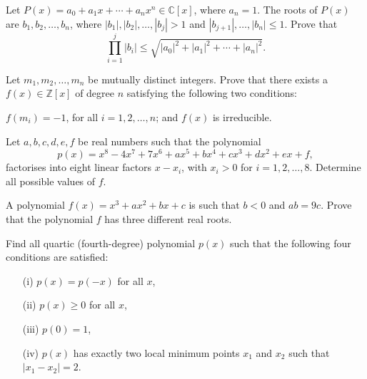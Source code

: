 \documentclass[12pt,a4paper]{memoir}
\theoremstyle{definition}
\begin{document}
\begin{question}[name={1995 Taiwan}]
	Let $P(x)=a_{0}+a_{1}x+\cdots+a_{n}x^{n}\in\mathbb{C}[x]$, where $a_{n}=1$. The roots of $P(x)$ are $b_{1},b_{2},\dots,b_{n}$, where $|b_{1}|,|b_{2}|,\dots,|b_{j}|>1$ and $|b_{j+1}|,\dots,|b_{n}|\leq 1$. Prove that \[\prod_{i=1}^{j} |b_{i}| \leq \sqrt{|a_{0}|^{2}+|a_{1}|^{2}+\cdots+|a_{n}|^{2}}.\]
\end{question}



\begin{question}[name={1995 Taiwan}]
	Let $m_{1},m_{2},\dots,m_{n}$ be mutually distinct integers. Prove that there exists a $f(x)\in\mathbb{Z}[x]$ of degree $n$ satisfying the following two conditions:
	\begin{tasks}
		\task $f(m_{i})=-1$, for all $i=1,2,\dots,n$; and
		\task $f(x)$ is irreducible.
	\end{tasks}
\end{question}



\begin{question}[name={2003 APMO}]
	Let $a,b,c,d,e,f$ be real numbers such that the polynomial
	\[ p(x)=x^8-4x^7+7x^6+ax^5+bx^4+cx^3+dx^2+ex+f, \]
	factorises into eight linear factors $x-x_i$, with $x_i>0$ for $i=1,2,\dots,8$. Determine all possible values of $f$.
\end{question}



\begin{question}[name={1992 Baltic Way}]
	A polynomial $f(x)=x^3+ax^2+bx+c$ is such that $b<0$ and $ab=9c$. Prove that the polynomial $f$ has three different real roots.	
\end{question}


\begin{question}[name={1992 Baltic Way}]
	Find all quartic (fourth-degree) polynomial $p(x)$ such that the following four conditions are satisfied:
	\begin{itemize}
		\item[(i)]  $p(x)=p(-x)$ for all $x$,
		\item[(ii)] $p(x)\ge0$ for all $x$,
		\item[(iii)] $p(0)=1$,
		\item[(iv)] $p(x)$ has exactly two local minimum points $x_1$ and $x_2$ such that $|x_1-x_2|=2$.
	\end{itemize}
\end{question}
\end{document}
